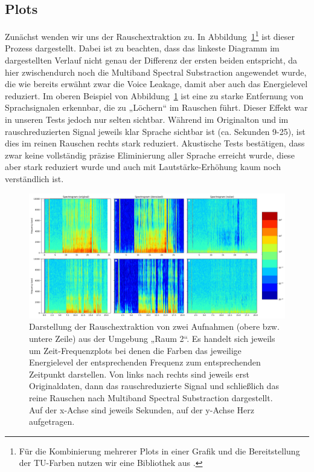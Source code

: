 \documentclass[
	fontsize=10.5pt,
	marginpar=false,
	ngerman,
	accentcolor=3d
	]{tudapub}
\begin{document}
\pagebreak
\subsection{Plots}
\label{plots}

Zunächst wenden wir uns der Rauschextraktion zu. In Abbildung~\ref{fig:denoise}\footnote{Für die Kombinierung mehrerer Plots in einer Grafik und die Bereitstellung der TU-Farben nutzen wir eine Bibliothek aus \cite{damken_fdamkenbachelors-thesis_code_2020}.} ist dieser Prozess dargestellt. Dabei ist zu beachten, dass das linkeste Diagramm im dargestellten Verlauf nicht genau der Differenz der ersten beiden entspricht, da hier zwischendurch noch die Multiband Spectral Substraction angewendet wurde, die wie bereits erwähnt zwar die Voice Leakage, damit aber auch das Energielevel reduziert. Im oberen Beispiel von Abbildung~\ref{fig:denoise} ist eine zu starke Entfernung von Sprachsignalen erkennbar, die zu „Löchern“ im Rauschen führt. Dieser Effekt war in unseren Tests jedoch nur selten sichtbar. Während im Originalton und im rauschreduzierten Signal jeweils klar Sprache sichtbar ist (ca. Sekunden 9-25), ist dies im reinen Rauschen rechts stark reduziert. Akustische Tests bestätigen, dass zwar keine vollständig präzise Eliminierung aller Sprache erreicht wurde, diese aber stark reduziert wurde und auch mit Lautstärke-Erhöhung kaum noch verständlich ist.

\begin{figure}[h]
	\centering
	\includegraphics[width=1.0\textwidth]{media/denoiser2mp}
	\caption{Darstellung der Rauschextraktion von zwei Aufnahmen (obere bzw. untere Zeile) aus der Umgebung „Raum 2“. Es handelt sich jeweils um Zeit-Frequenzplots bei denen die Farben das jeweilige Energielevel der entsprechenden Frequenz zum entsprechenden Zeitpunkt darstellen. Von links nach rechts sind jeweils erst Originaldaten, dann das rauschreduzierte Signal und schließlich das reine Rauschen nach Multiband Spectral Substraction dargestellt. Auf der x-Achse sind jeweils Sekunden, auf der y-Achse Herz aufgetragen.}
	\label{fig:denoise}
\end{figure}
\end{document}
